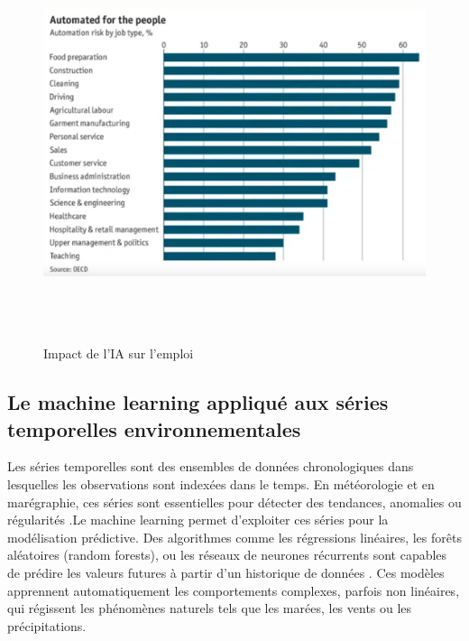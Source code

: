 \documentclass[a4paper,12pt,openany]{report}
\begin{document}
	 		\begin{figure}[H]
		\begin{center}
                \begin{minipage}{\textwidth}
	    	     \begin{center}
	    	      \includegraphics[width=1\textwidth,height=4.6in]{images/Impact_de_IA .png}
	    	      \end{center}
	    	     \end{minipage}
			
			\caption{Impact de l’IA sur l’emploi  \cite{LeCun2015}\label{Fig 1.7}}
		\end{center}
	\end{figure}%
	

	\subsection{Le machine learning appliqué aux séries temporelles environnementales}
	
	\quad Les séries temporelles sont des ensembles de données chronologiques dans lesquelles les observations sont indexées dans le temps. En météorologie et en marégraphie, ces séries sont essentielles pour détecter des tendances, anomalies ou régularités \cite{Hyndman2018}.Le machine learning permet d’exploiter ces séries pour la modélisation prédictive. Des algorithmes comme les régressions linéaires, les forêts aléatoires (random forests), ou les réseaux de neurones récurrents  sont capables de prédire les valeurs futures à partir d’un historique de données\cite{Zhang2020} .
	Ces modèles apprennent automatiquement les comportements complexes, parfois non linéaires, qui régissent les phénomènes naturels tels que les marées, les vents ou les précipitations.
	
\end{document}
